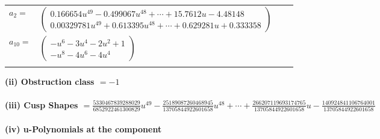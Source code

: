 \documentclass[1p]{elsarticle_modified}
\theoremstyle{definition}
\begin{document}
\begin{tabular}{m{7pt} m{180pt} m{7pt} m{180pt} }
\flushright $a_{2}=$&$\begin{pmatrix}0.166654 u^{49}-0.499067 u^{48}+\cdots+15.7612 u-4.48148\\0.00329781 u^{49}+0.613395 u^{48}+\cdots+0.629281 u+0.333358\end{pmatrix}$ \\
\flushright $a_{10}=$&$\begin{pmatrix}- u^6-3 u^4-2 u^2+1\\- u^8-4 u^6-4 u^4\end{pmatrix}$\\&\end{tabular}
\flushleft \textbf{(ii) Obstruction class $= -1$}\\~\\
\flushleft \textbf{(iii) Cusp Shapes $= \frac{5330467839288029}{6852922461300829} u^{49}-\frac{25189087260468945}{13705844922601658} u^{48}+\cdots+\frac{266207119693174765}{13705844922601658} u-\frac{140924841106764001}{13705844922601658}$}\\~\\
\newpage\renewcommand{\arraystretch}{1}
\flushleft \textbf{(iv) u-Polynomials at the component}\newline \\
\end{document}
